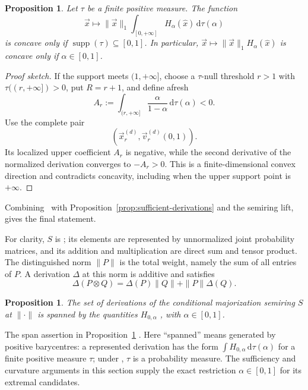 \documentclass[aps,pra,11pt,onecolumn,nofootinbib,tightenlines]{revtex4-2}
\newtheorem{proposition}[theorem]{Proposition}
\theoremstyle{definition}
\def \d {\mathrm{d}}
\begin{document}
\begin{proposition}
\label{prop:measure-derivation}
Let $\tau$ be a finite positive measure.  The function
\[
\vec{x}\longmapsto\|\vec{x}\|_1
\int_{[0,+\infty]}H_\alpha(\hat{x})\,\d\tau(\alpha)
\]
is concave only if
$\operatorname{supp}(\tau)\subseteq[0,1]$.  In particular,
$\vec{x}\mapsto\|\vec{x}\|_1H_\alpha(\hat{x})$ is concave only if
$\alpha\in[0,1]$.
\end{proposition}

\begin{proof}[Proof sketch]
If the support meets $(1,+\infty]$, choose a $\tau$-null threshold $r>1$ with
$\tau((r,+\infty])>0$, put $R=r+1$, and define afresh
\[
A_r:=\int_{(r,+\infty]}
\frac{\alpha}{1-\alpha}\,\d\tau(\alpha)<0.
\]
Use the complete pair
\begin{equation}
\left(
\vec{x}_r^{(d)},
\vec{v}_r^{(d)}(0,1)
\right).
\label{eq:derivation-upper-witness-pair}
\end{equation}
Its localized upper
coefficient $A_r$ is negative, while the second derivative of the normalized
derivation converges to $-A_r>0$.  This is a finite-dimensional convex direction
and contradicts concavity, including when the upper support point is
$+\infty$.
\end{proof}

Combining \ParameterMainDerivationRepresentation\ with
Proposition~\ref{prop:sufficient-derivations} and the semiring lift, gives the
final statement.

For clarity, $S$ is \ParameterMainSemiring; its elements are represented by
unnormalized joint probability matrices, and its addition
and multiplication are direct sum and tensor product.  The distinguished norm
$\|P\|$ is the total weight, namely the sum of all entries of $P$.  A
derivation $\Delta$ at this norm is additive and satisfies
\[
\Delta(P\otimes Q)
=\Delta(P)\|Q\|+\|P\|\Delta(Q).
\]

\begin{proposition}
\label{prop:Derivations}
The set of derivations of the conditional majorization semiring $S$ at
$\|\cdot\|$ is spanned by the quantities $H_{0,\alpha}$
\ParameterMainDerivationDefinition, with $\alpha\in[0,1]$.
\end{proposition}

The span assertion in Proposition~\ref{prop:Derivations} \ParameterSpanOrigin.
Here ``spanned'' means generated by positive
barycentres: a represented derivation has the form
$\int H_{0,\alpha}\,\d\tau(\alpha)$ for a finite positive measure $\tau$;
under \ParameterMainNormalization, $\tau$ is a probability measure.
The sufficiency and curvature arguments in this section supply the exact
restriction $\alpha\in[0,1]$ for its extremal candidates.
\end{document}
